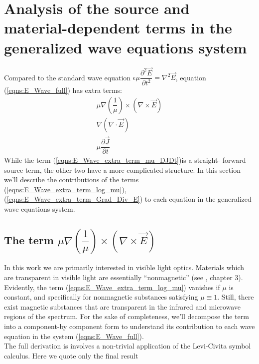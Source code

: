\documentclass[12pt,twoside]{report}
\begin{document}
\section{Analysis of the source and material-dependent terms in the generalized wave equations system}

Compared to the standard wave equation $\epsilon \mu\dfrac{\partial ^2\overrightarrow{E}}{\partial t^2} =  \nabla^2 \overrightarrow{E}$, equation (\ref{eqns:E_Wave_full}) has extra terms:
\begin{subequations}
\begin{align}
\mu \nabla \left( \dfrac{1}{\mu} \right) \times \left(\nabla \times \overrightarrow{E} \right) \label{eqns:E_Wave_extra_term_log_mu}\\
\nabla (\nabla \cdot \overrightarrow{E}) \label{eqns:E_Wave_extra_term_Grad_Div_E} \\
\mu \dfrac{\partial \overrightarrow{J}}{\partial t} \label{eqns:E_Wave_extra_term_mu_DJDt} 
\end{align}
\end{subequations}
While the term (\ref{eqns:E_Wave_extra_term_mu_DJDt})is a straight- forward source term, the other two have a more complicated structure. In this section we'll describe the contributions of the terms (\ref{eqns:E_Wave_extra_term_log_mu}), (\ref{eqns:E_Wave_extra_term_Grad_Div_E}) to each equation in the generalized wave equations system.

\subsection{The term $\mu \nabla \left( \dfrac{1}{\mu} \right) \times \left(\nabla \times \vec{E} \right)$}

In this work we are primarily interested in visible light optics. Materials which are transparent in visible light are essentially ``nonmagnetic'' (see \cite{Hecht2002}, chapter 3). Evidently, the term (\ref{eqns:E_Wave_extra_term_log_mu}) vanishes if $\mu$ is constant, and specifically for nonmagnetic substances satisfying $\mu \equiv 1$. Still, there exist magnetic substances that are transparent in the infrared and microwave regions of the spectrum. For the sake of completeness, we'll decompose the term into a component-by component form to understand its contribution to each wave equation in  the system (\ref{eqns:E_Wave_full}).\\
The full derivation is involves a non-trivial application of the Levi-Civita symbol calculus. Here we quote only the final result
\end{document}
